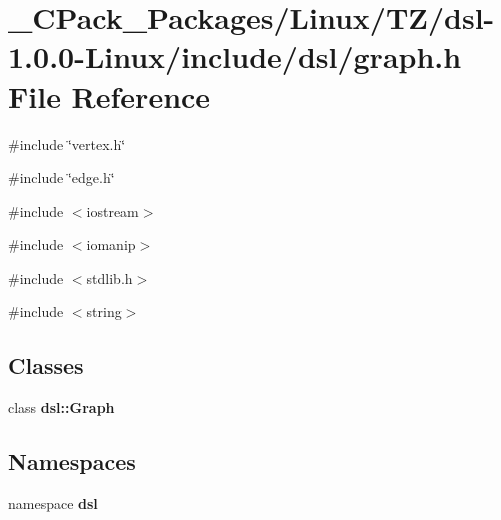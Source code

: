 \section{\_\-CPack\_\-Packages/Linux/TZ/dsl-\/1.0.0-\/Linux/include/dsl/graph.h File Reference}
\label{__CPack__Packages_2Linux_2TZ_2dsl-1_80_80-Linux_2include_2dsl_2graph_8h}
{\ttfamily \#include \char`\"{}vertex.h\char`\"{}}\par
{\ttfamily \#include \char`\"{}edge.h\char`\"{}}\par
{\ttfamily \#include $<$iostream$>$}\par
{\ttfamily \#include $<$iomanip$>$}\par
{\ttfamily \#include $<$stdlib.h$>$}\par
{\ttfamily \#include $<$string$>$}\par
\subsection*{Classes}
\begin{DoxyCompactItemize}
\item 
class {\bf dsl::Graph}
\end{DoxyCompactItemize}
\subsection*{Namespaces}
\begin{DoxyCompactItemize}
\item 
namespace {\bf dsl}
\end{DoxyCompactItemize}
